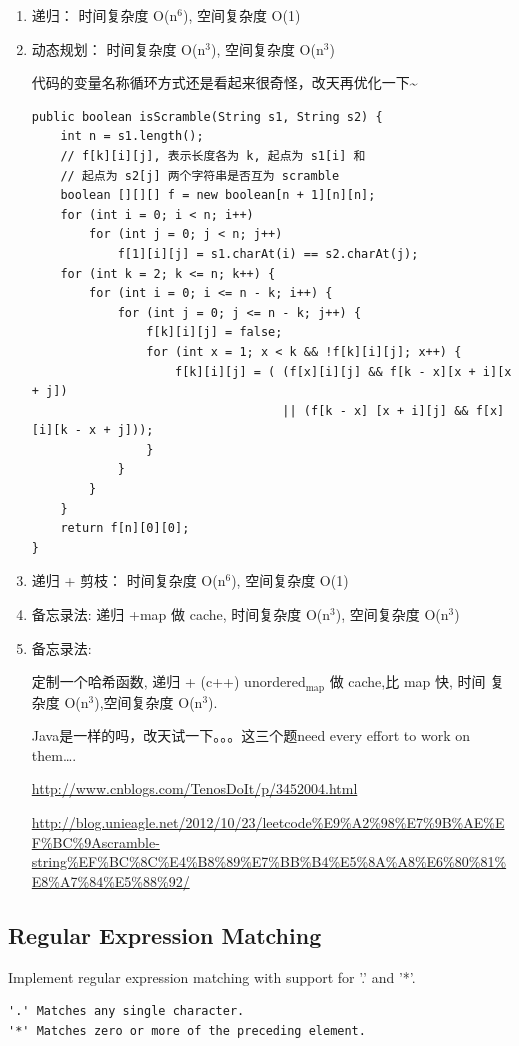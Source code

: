 \documentclass[12pt]{book}
\begin{document}
\begin{enumerate}
\item 递归： 时间复杂度 O(n$^{\text{6}}$), 空间复杂度 O(1)
\label{sec-14-3-8-1}
\item 动态规划： 时间复杂度 O(n$^{\text{3}}$), 空间复杂度 O(n$^{\text{3}}$)
\label{sec-14-3-8-2}

代码的变量名称循环方式还是看起来很奇怪，改天再优化一下\textasciitilde{}~

\lstset{language=java,label= ,caption= ,numbers=none}
\begin{lstlisting}
public boolean isScramble(String s1, String s2) {
    int n = s1.length();
    // f[k][i][j], 表示长度各为 k, 起点为 s1[i] 和
    // 起点为 s2[j] 两个字符串是否互为 scramble
    boolean [][][] f = new boolean[n + 1][n][n];
    for (int i = 0; i < n; i++) 
        for (int j = 0; j < n; j++) 
            f[1][i][j] = s1.charAt(i) == s2.charAt(j);
    for (int k = 2; k <= n; k++) {
        for (int i = 0; i <= n - k; i++) {
            for (int j = 0; j <= n - k; j++) {
                f[k][i][j] = false;
                for (int x = 1; x < k && !f[k][i][j]; x++) {
                    f[k][i][j] = ( (f[x][i][j] && f[k - x][x + i][x + j])
                                   || (f[k - x] [x + i][j] && f[x][i][k - x + j]));
                }
            }
        }
    }
    return f[n][0][0];
}
\end{lstlisting}

\item 递归 + 剪枝： 时间复杂度 O(n$^{\text{6}}$), 空间复杂度 O(1)
\label{sec-14-3-8-3}
\item 备忘录法: 递归 +map 做 cache, 时间复杂度 O(n$^{\text{3}}$), 空间复杂度 O(n$^{\text{3}}$)
\label{sec-14-3-8-4}
\item 备忘录法:
\label{sec-14-3-8-5}

定制一个哈希函数, 递归 + (c++) unordered$_{\text{map}}$ 做 cache,比 map 快, 时间
复杂度 O(n$^{\text{3}}$),空间复杂度 O(n$^{\text{3}}$).

Java是一样的吗，改天试一下。。。这三个题need every effort to work on them\ldots{}.

\url{http://www.cnblogs.com/TenosDoIt/p/3452004.html}

\url{http://blog.unieagle.net/2012/10/23/leetcode\%E9\%A2\%98\%E7\%9B\%AE\%EF\%BC\%9Ascramble-string\%EF\%BC\%8C\%E4\%B8\%89\%E7\%BB\%B4\%E5\%8A\%A8\%E6\%80\%81\%E8\%A7\%84\%E5\%88\%92/}
\end{enumerate}


\subsection{Regular Expression Matching}
\label{sec-14-3-9}
Implement regular expression matching with support for '.' and '*'.
\lstset{language=java,label= ,caption= ,numbers=none}
\begin{lstlisting}
'.' Matches any single character.
'*' Matches zero or more of the preceding element.
\end{lstlisting}
\end{document}
